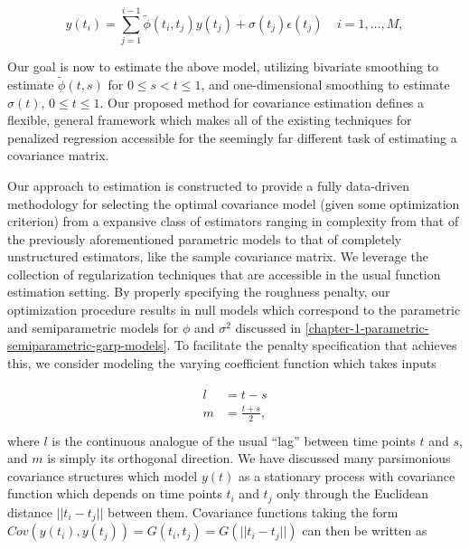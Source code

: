 \begin{equation}  \label{eq:cholesky-regression-model-1} 
y\left(t_{i} \right)  = \sum_{j=1}^{i-1} \tilde{\phi}\left(t_{i} ,t_{j}\right) y\left(t_{j}\right) + \sigma\left(t_{j}\right)\epsilon\left({t_j}\right) \;\;\;\; i=1,\dots, M, 
\end{equation}
\noindent

Our goal is now to estimate the above model, utilizing bivariate smoothing to estimate $\tilde{\phi}\left(t,s\right)$ for $0 \le s < t \le 1$,  and one-dimensional smoothing to estimate $\sigma\left(t \right)$, $0 \le t \le 1$. Our proposed method for covariance estimation defines a flexible, general framework which makes all of the existing techniques for penalized regression accessible for the seemingly far different task of estimating a covariance matrix.

\bigskip

Our approach to estimation is constructed to provide a fully data-driven methodology for selecting the optimal covariance model (given some optimization criterion) from a expansive class of estimators ranging in complexity from that of the previously aforementioned parametric models to that of completely unstructured estimators, like the sample covariance matrix. We leverage the collection of regularization techniques that are accessible in the usual function estimation setting. By properly specifying the roughness penalty, our optimization procedure results in null models which correspond to the parametric and semiparametric models for $\phi$ and $\sigma^2$ discussed in \ref{chapter-1-parametric-semiparametric-garp-models}. To facilitate the penalty specification that achieves this, we consider modeling the varying coefficient function which takes inputs

\begin{align} 
\begin{split}\label{eq:l-m-transformation}
l &= t - s \\
m &= \frac{t + s}{2}, \\
\end{split}
\end{align}
\noindent
 where $l$ is the continuous analogue of the usual ``lag'' between time points $t$ and $s$, and $m$ is simply its orthogonal direction. We have discussed many parsimonious covariance structures which model $y\left(t\right)$ as a stationary process with covariance function which depends on time points $t_i$ and $t_j$ only through the Euclidean distance $\vert \vert t_i - t_j \vert \vert$ between them. Covariance functions taking the form $Cov\left(y\left( t_i \right),y\left( t_j \right)\right) =G\left(t_i,t_j\right) = G\left(\vert \vert t_i - t_j \vert \vert \right)$ can then be written as 

